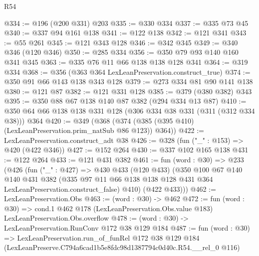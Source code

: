 \begin{lexlean}{R54}
\begin{coremodule}
@334 := @196 (@200 @331) @203
@335 := @330 @334
@337 := @335 @73 @45
@340 := @337 @94 @161 @138
@341 := @122 @138
@342 := @121 @341
@343 := @55 @261
@345 := @121 @343 @128
@346 := @342 @345
@349 := @340 @346 (@120 @346)
@350 := @285 @334
@356 := @350 @79 @93 @140 @160 @341 @345
@363 := @335 @76 @11 @66 @138 @138 @128 @341
@364 := @319 @334
@368 := @356 (@363 @364 LexLeanPreservation.construct_true)
@374 := @350 @91 @66 @143 @138 @343 @128
@379 := @273 @334 @81 @90 @141 @138
@380 := @121 @87
@382 := @121 @331 @128
@385 := @379 (@380 @382) @343
@395 := @350 @88 @67 @138 @140 @87 @382 (@294 @334 @13 @87)
@410 := @350 @64 @66 @138 @138 @331 @128 (@306 @334 @38 @331 (@311 (@312 @334 @38))) @364
@420 := @349 (@368 (@374 (@385 (@395 @410) (LexLeanPreservation.prim_natSub @86 @123)) @364))
@422 := LexLeanPreservation.construct_adt @38
@426 := @328 (fun ("_" : @153) => @420 (@422 @346))
@427 := @152 @264
@430 := @337 @102 @165 @138
@431 := @122 @264
@433 := @121 @431 @382
@461 := fun (word : @30) =>
  @233
    (@426
      (fun ("_" : @427) =>
      @430
        @433
        (@120 @433)
        (@350
          @100
          @67
          @140
          @140
          @431
          @382
          (@335 @97 @11 @66 @138 @138 @128 @431 @364 LexLeanPreservation.construct_false)
          @410)
        (@422 @433)))
@462 := LexLeanPreservation.Obs
@463 := (word : @30) -> @462
@472 := fun (word : @30) =>
  cond.{1} @462 @178 (LexLeanPreservation.Obs.value @183) LexLeanPreservation.Obs.overflow
@478 := (word : @30) -> LexLeanPreservation.RunConv @172 @38 @129 @184
@487 := fun (word : @30) =>
  LexLeanPreservation.run_of_funRel
    @172
    @38
    @129
    @184
    (LexLeanPreserve.C794a6cad1b5e8fdc98d1387794c0d40c.R54.__rel_0 @116)
\end{coremodule}
\end{lexlean}
